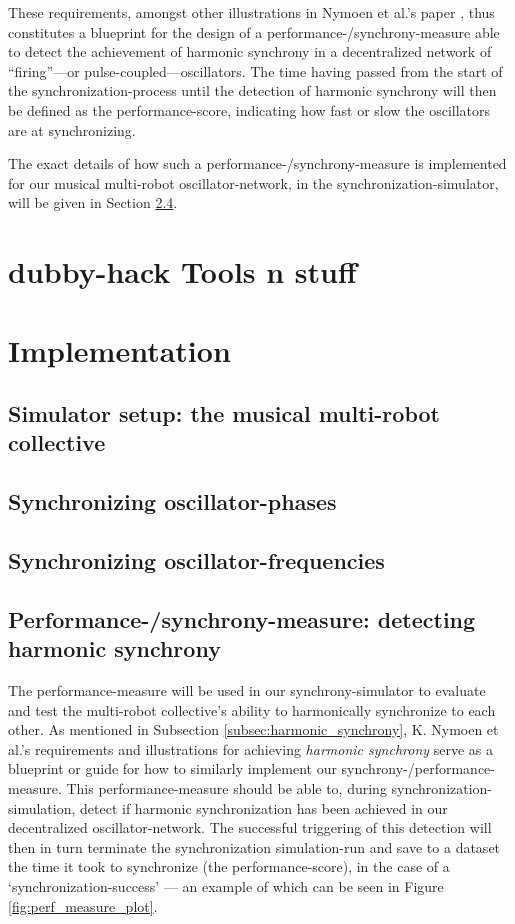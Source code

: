 			These requirements, amongst other illustrations in Nymoen et al.'s paper \cite{nymoen_synch}, thus constitutes a blueprint for the design of a performance-/synchrony-measure able to detect the achievement of harmonic synchrony in a decentralized network of ``firing''—or pulse-coupled—oscillators. The time having passed from the start of the synchronization-process until the detection of harmonic synchrony will then be defined as the performance-score, indicating how fast or slow the oscillators are at synchronizing.
			
			The exact details of how such a performance-/synchrony-measure is implemented for our musical multi-robot oscillator-network, in the synchronization-simulator, will be given in Section \ref{sec:performance_measure}.
	
	
	\chapter{dubby-hack Tools n stuff}
	
	\chapter{Implementation}
	\label{chap:implementation}
	
		\section{Simulator setup: the musical multi-robot collective}
		\section{Synchronizing oscillator-phases}
		\section{Synchronizing oscillator-frequencies}
	
		\section{Performance-/synchrony-measure: detecting harmonic synchrony}
		\label{sec:performance_measure}

		The performance-measure will be used in our synchrony-simulator to evaluate and test the multi-robot collective's ability to harmonically synchronize to each other. As mentioned in Subsection \ref{subsec:harmonic_synchrony}, K. Nymoen et al.'s requirements and illustrations \cite{nymoen_synch} for achieving \textit{harmonic synchrony} serve as a blueprint or guide for how to similarly implement our synchrony-/performance-measure. This performance-measure should be able to, during synchronization-simulation, detect if harmonic synchronization has been achieved in our decentralized oscillator-network. The successful triggering of this detection will then in turn terminate the synchronization simulation-run and save to a dataset the time it took to synchronize (the performance-score), in the case of a `synchronization-success' — an example of which can be seen in Figure \ref{fig:perf_measure_plot}.

